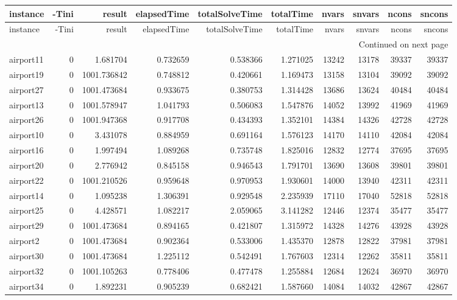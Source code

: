 
\begin{longtable}{|l|r|r|r|r|r|r|r|r|r|}
\toprule
instance & -Tini & result & elapsedTime & totalSolveTime & totalTime & nvars & snvars & ncons & sncons \\
\midrule
\endfirsthead
\toprule
instance & -Tini & result & elapsedTime & totalSolveTime & totalTime & nvars & snvars & ncons & sncons \\
\midrule
\endhead
\midrule
\multicolumn{10}{r}{Continued on next page} \\
\midrule
\endfoot
\bottomrule
\endlastfoot
airport11 & 0 & 1.681704 & 0.732659 & 0.538366 & 1.271025 & 13242 & 13178 & 39337 & 39337 \\
airport19 & 0 & 1001.736842 & 0.748812 & 0.420661 & 1.169473 & 13158 & 13104 & 39092 & 39092 \\
airport27 & 0 & 1001.473684 & 0.933675 & 0.380753 & 1.314428 & 13686 & 13624 & 40484 & 40484 \\
airport13 & 0 & 1001.578947 & 1.041793 & 0.506083 & 1.547876 & 14052 & 13992 & 41969 & 41969 \\
airport26 & 0 & 1001.947368 & 0.917708 & 0.434393 & 1.352101 & 14384 & 14326 & 42728 & 42728 \\
airport10 & 0 & 3.431078 & 0.884959 & 0.691164 & 1.576123 & 14170 & 14110 & 42084 & 42084 \\
airport16 & 0 & 1.997494 & 1.089268 & 0.735748 & 1.825016 & 12832 & 12774 & 37695 & 37695 \\
airport20 & 0 & 2.776942 & 0.845158 & 0.946543 & 1.791701 & 13690 & 13608 & 39801 & 39801 \\
airport22 & 0 & 1001.210526 & 0.959648 & 0.970953 & 1.930601 & 14000 & 13940 & 42311 & 42311 \\
airport14 & 0 & 1.095238 & 1.306391 & 0.929548 & 2.235939 & 17110 & 17040 & 52818 & 52818 \\
airport25 & 0 & 4.428571 & 1.082217 & 2.059065 & 3.141282 & 12446 & 12374 & 35477 & 35477 \\
airport29 & 0 & 1001.473684 & 0.894165 & 0.421807 & 1.315972 & 14328 & 14276 & 43928 & 43928 \\
airport2 & 0 & 1001.473684 & 0.902364 & 0.533006 & 1.435370 & 12878 & 12822 & 37981 & 37981 \\
airport30 & 0 & 1001.473684 & 1.225112 & 0.542491 & 1.767603 & 12314 & 12262 & 35811 & 35811 \\
airport32 & 0 & 1001.105263 & 0.778406 & 0.477478 & 1.255884 & 12684 & 12624 & 36970 & 36970 \\
airport34 & 0 & 1.892231 & 0.905239 & 0.682421 & 1.587660 & 14084 & 14032 & 42867 & 42867 \\

\end{longtable}
